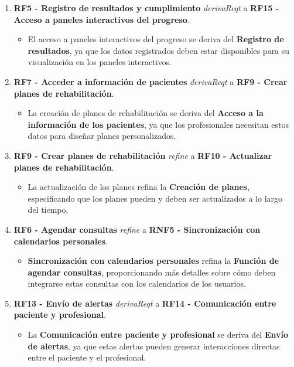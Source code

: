 \documentclass{article}
\begin{document}
\begin{enumerate}
	\item \textbf{RF5 - Registro de resultados y cumplimiento} \textit{derivaReqt} a \textbf{RF15 - Acceso a paneles interactivos del progreso}.
	\begin{itemize}
		\item El acceso a paneles interactivos del progreso se deriva del \textbf{Registro de resultados}, ya que los datos registrados deben estar disponibles para su visualización en los paneles interactivos.
	\end{itemize}
	
	\item \textbf{RF7 - Acceder a información de pacientes} \textit{derivaReqt} a \textbf{RF9 - Crear planes de rehabilitación}.
	\begin{itemize}
		\item La creación de planes de rehabilitación se deriva del \textbf{Acceso a la información de los pacientes}, ya que los profesionales necesitan estos datos para diseñar planes personalizados.
	\end{itemize}
	
	\item \textbf{RF9 - Crear planes de rehabilitación} \textit{refine} a \textbf{RF10 - Actualizar planes de rehabilitación}.
	\begin{itemize}
		\item La actualización de los planes refina la \textbf{Creación de planes}, especificando que los planes pueden y deben ser actualizados a lo largo del tiempo.
	\end{itemize}
	
	\item \textbf{RF6 - Agendar consultas} \textit{refine} a \textbf{RNF5 - Sincronización con calendarios personales}.
	\begin{itemize}
		\item \textbf{Sincronización con calendarios personales} refina la \textbf{Función de agendar consultas}, proporcionando más detalles sobre cómo deben integrarse estas consultas con los calendarios de los usuarios.
	\end{itemize}
	
	\item \textbf{RF13 - Envío de alertas} \textit{derivaReqt} a \textbf{RF14 - Comunicación entre paciente y profesional}.
	\begin{itemize}
		\item La \textbf{Comunicación entre paciente y profesional} se deriva del \textbf{Envío de alertas}, ya que estas alertas pueden generar interacciones directas entre el paciente y el profesional.
	\end{itemize}
	

\end{enumerate}
\end{document}
